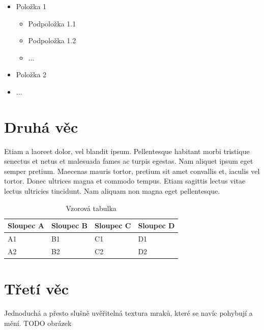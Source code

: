 \documentclass[12pt,a4paper,titlepage,final]{report}
\begin{document}
\begin{itemize}
	\item Položka 1
	\begin{itemize}
		\item Podpoložka 1.1
		\item Podpoložka 1.2
		\item $\ldots$
	\end{itemize}
	\item Položka 2
	\item $\ldots$
\end{itemize}


\section{Druhá věc}

Etiam a laoreet dolor, vel blandit ipsum. Pellentesque habitant morbi tristique senectus et netus et malesuada fames ac turpis egestas. Nam aliquet ipsum eget semper pretium. Maecenas mauris tortor, pretium sit amet convallis et, iaculis vel tortor. Donec ultrices magna et commodo tempus. Etiam sagittis lectus vitae lectus ultricies tincidunt. Nam aliquam non magna eget pellentesque. 

\begin{table}[h!]
	\begin{center}
    \begin{tabular}{ | p{3.5cm} | p{3.5cm} | p{3.5cm} | p{3.5cm} |}
    \hline
    Sloupec A & Sloupec B & Sloupec C & Sloupec D
    \\ \hline
    
	A1 & B1 & C1 & D1
	\\ \hline
	
	A2 & B2 & C2 & D2
	\\ \hline
	
    \end{tabular}
	\end{center}	
	\caption{Vzorová tabulka}  
\end{table}

\section{Třetí věc}
  	Jednoduchá a přesto slušně uvěřitelná textura mraků, které se navíc pohybují a mění.
    TODO obrázek
    
\end{document}
